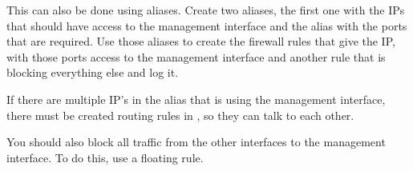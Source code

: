 
This can also be done using aliases. Create two aliases, the first one with the IPs that should have access to the management interface and the alias with the ports that are required. Use those aliases to create the firewall rules that give the IP, with those ports access to the management interface and another rule that is blocking everything else and log it.

If there are multiple IP's in the alias that is using the management interface, there must be created routing rules in , so they can talk to each other.

You should also block all traffic from the other interfaces to the management interface. To do this, use a floating rule.

